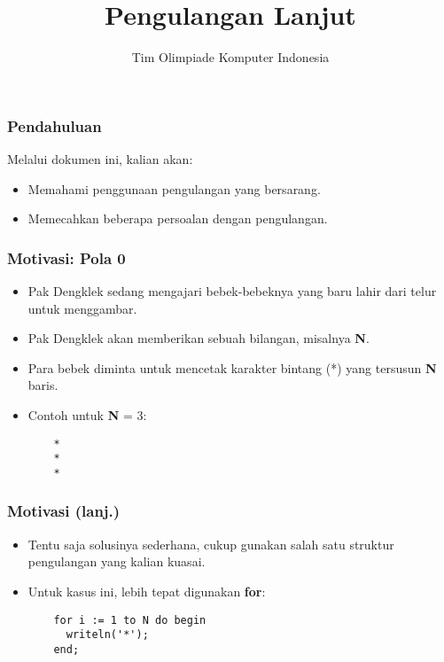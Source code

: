 \documentclass{beamer}
\title{Pengulangan Lanjut}
\author{Tim Olimpiade Komputer Indonesia}
\date{}
\begin{document}
\begin{frame}
\titlepage
\end{frame}

\begin{frame}
\frametitle{Pendahuluan}
Melalui dokumen ini, kalian akan:
\begin{itemize}
  \item Memahami penggunaan pengulangan yang bersarang.
  \item Memecahkan beberapa persoalan dengan pengulangan.
\end{itemize}
\end{frame}

\begin{frame}[fragile]
\frametitle{Motivasi: Pola 0}
\begin{itemize}
  \item Pak Dengklek sedang mengajari bebek-bebeknya yang baru lahir dari telur untuk menggambar.
  \item Pak Dengklek akan memberikan sebuah bilangan, misalnya \textbf{N}.
  \item Para bebek diminta untuk mencetak karakter bintang (*) yang tersusun \textbf{N} baris.
  \item Contoh untuk \textbf{N} = 3:
  \begin{lstlisting}
    *
    *
    *
  \end{lstlisting}
\end{itemize}
\end{frame}

\begin{frame}[fragile]
\frametitle{Motivasi (lanj.)}
\begin{itemize}
  \item Tentu saja solusinya sederhana, cukup gunakan salah satu struktur pengulangan yang kalian kuasai.
  \item Untuk kasus ini, lebih tepat digunakan \textbf{for}:
  \begin{lstlisting}
    for i := 1 to N do begin
      writeln('*');
    end;
  \end{lstlisting}
\end{itemize}
\end{frame}
\end{document}
